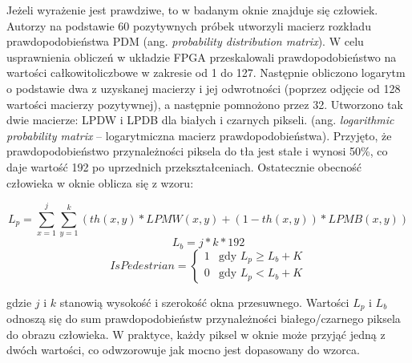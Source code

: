 Jeżeli wyrażenie jest prawdziwe, to w badanym oknie znajduje się człowiek. 
Autorzy na podstawie 60 pozytywnych próbek utworzyli macierz rozkładu prawdopodobieństwa PDM (ang. \textit{probability distribution matrix}). 
W celu usprawnienia obliczeń w układzie FPGA przeskalowali prawdopodobieństwo na wartości całkowitoliczbowe w zakresie od 1 do 127. 
Następnie obliczono logarytm o podstawie dwa z uzyskanej macierzy i jej odwrotności (poprzez odjęcie od 128 wartości macierzy pozytywnej), a następnie pomnożono przez 32. %
Utworzono tak dwie macierze: LPDW i LPDB dla białych i czarnych pikseli. (ang. \textit{logarithmic probability matrix} – logarytmiczna macierz prawdopodobieństwa). 
Przyjęto, że prawdopodobieństwo przynależności piksela do tła jest stałe i wynosi 50\%, co daje wartość 192 po uprzednich przekształceniach. 
Ostatecznie obecność człowieka w oknie oblicza się z wzoru: %

\begin{equation}\label{equ:Lp}
L_{p} = \sum_{x=1}^{j}\sum_{y=1}^{k}(th(x,y)*LPMW(x,y)+(1-th(x,y))*LPMB(x,y))
\end{equation}
\begin{equation}\label{equ:Lb}
L_{b} = j*k*192
\end{equation}
\begin{equation} \label{equ:ispedistant}
IsPedestrian = \left\{ \begin{array}{ll}
1 & \textrm{gdy $L_{p} \geq L_{b} + K$}\\
0 & \textrm{gdy $L_{p}<L_{b} + K$}
\end{array} \right.
\end{equation}

\noindent gdzie $j$ i $k$ stanowią wysokość i szerokość okna przesuwnego. Wartości $L_p$ i $L_b$ odnoszą się do sum prawdopodobieństw przynależności białego/czarnego piksela do obrazu człowieka. W praktyce, każdy piksel w oknie może przyjąć jedną z dwóch wartości, co odwzorowuje jak mocno jest dopasowany do wzorca. %




